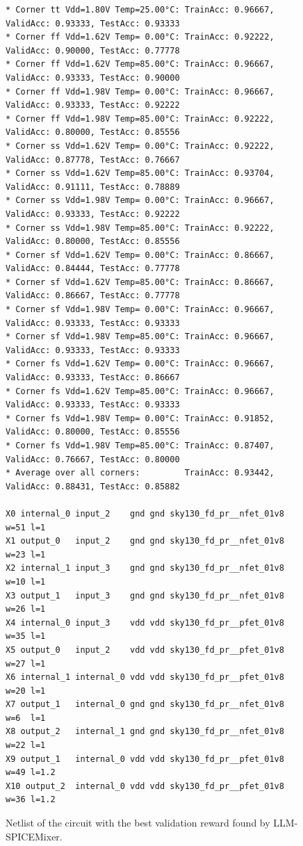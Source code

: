\documentclass[sigconf,pbalance]{acmart_modified}
\newcommand{\llmspm}{LLM-SPICE\-Mixer}
\begin{document}
\begin{figure}[H]
\begin{prompt}
\footnotesize
\begin{Verbatim}
* Corner tt Vdd=1.80V Temp=25.00°C: TrainAcc: 0.96667, ValidAcc: 0.93333, TestAcc: 0.93333
* Corner ff Vdd=1.62V Temp= 0.00°C: TrainAcc: 0.92222, ValidAcc: 0.90000, TestAcc: 0.77778
* Corner ff Vdd=1.62V Temp=85.00°C: TrainAcc: 0.96667, ValidAcc: 0.93333, TestAcc: 0.90000
* Corner ff Vdd=1.98V Temp= 0.00°C: TrainAcc: 0.96667, ValidAcc: 0.93333, TestAcc: 0.92222
* Corner ff Vdd=1.98V Temp=85.00°C: TrainAcc: 0.92222, ValidAcc: 0.80000, TestAcc: 0.85556
* Corner ss Vdd=1.62V Temp= 0.00°C: TrainAcc: 0.92222, ValidAcc: 0.87778, TestAcc: 0.76667
* Corner ss Vdd=1.62V Temp=85.00°C: TrainAcc: 0.93704, ValidAcc: 0.91111, TestAcc: 0.78889
* Corner ss Vdd=1.98V Temp= 0.00°C: TrainAcc: 0.96667, ValidAcc: 0.93333, TestAcc: 0.92222
* Corner ss Vdd=1.98V Temp=85.00°C: TrainAcc: 0.92222, ValidAcc: 0.80000, TestAcc: 0.85556
* Corner sf Vdd=1.62V Temp= 0.00°C: TrainAcc: 0.86667, ValidAcc: 0.84444, TestAcc: 0.77778
* Corner sf Vdd=1.62V Temp=85.00°C: TrainAcc: 0.86667, ValidAcc: 0.86667, TestAcc: 0.77778
* Corner sf Vdd=1.98V Temp= 0.00°C: TrainAcc: 0.96667, ValidAcc: 0.93333, TestAcc: 0.93333
* Corner sf Vdd=1.98V Temp=85.00°C: TrainAcc: 0.96667, ValidAcc: 0.93333, TestAcc: 0.93333
* Corner fs Vdd=1.62V Temp= 0.00°C: TrainAcc: 0.96667, ValidAcc: 0.93333, TestAcc: 0.86667
* Corner fs Vdd=1.62V Temp=85.00°C: TrainAcc: 0.96667, ValidAcc: 0.93333, TestAcc: 0.93333
* Corner fs Vdd=1.98V Temp= 0.00°C: TrainAcc: 0.91852, ValidAcc: 0.80000, TestAcc: 0.85556
* Corner fs Vdd=1.98V Temp=85.00°C: TrainAcc: 0.87407, ValidAcc: 0.76667, TestAcc: 0.80000
* Average over all corners:         TrainAcc: 0.93442, ValidAcc: 0.88431, TestAcc: 0.85882

X0 internal_0 input_2    gnd gnd sky130_fd_pr__nfet_01v8 w=51 l=1
X1 output_0   input_2    gnd gnd sky130_fd_pr__nfet_01v8 w=23 l=1
X2 internal_1 input_3    gnd gnd sky130_fd_pr__nfet_01v8 w=10 l=1
X3 output_1   input_3    gnd gnd sky130_fd_pr__nfet_01v8 w=26 l=1
X4 internal_0 input_3    vdd vdd sky130_fd_pr__pfet_01v8 w=35 l=1
X5 output_0   input_2    vdd vdd sky130_fd_pr__pfet_01v8 w=27 l=1
X6 internal_1 internal_0 vdd vdd sky130_fd_pr__pfet_01v8 w=20 l=1
X7 output_1   internal_0 gnd gnd sky130_fd_pr__nfet_01v8 w=6  l=1
X8 output_2   internal_1 gnd gnd sky130_fd_pr__nfet_01v8 w=22 l=1
X9 output_1   internal_0 vdd vdd sky130_fd_pr__pfet_01v8 w=49 l=1.2
X10 output_2  internal_0 vdd vdd sky130_fd_pr__pfet_01v8 w=36 l=1.2
\end{Verbatim}
\end{prompt}
\caption{Netlist of the circuit with the best validation reward found by \llmspm{}.}
\label{fig:netlist}
\end{figure}
\end{document}
